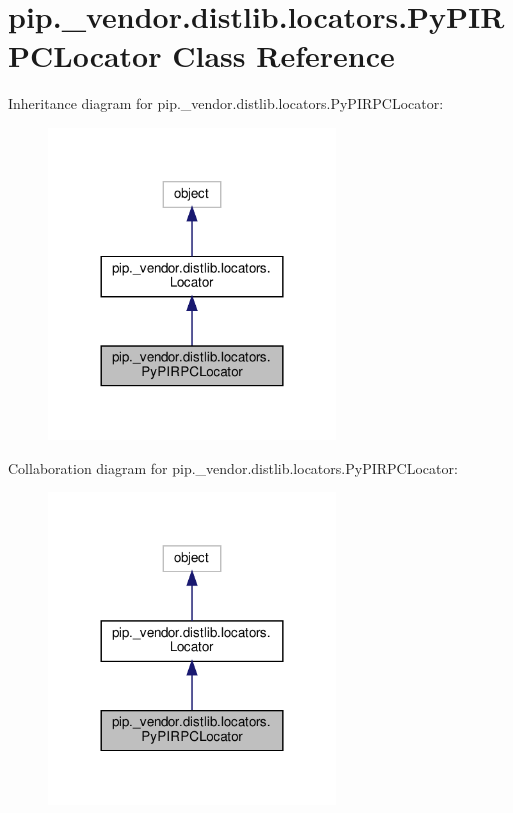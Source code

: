 \hypertarget{classpip_1_1__vendor_1_1distlib_1_1locators_1_1PyPIRPCLocator}{}\section{pip.\+\_\+vendor.\+distlib.\+locators.\+Py\+P\+I\+R\+P\+C\+Locator Class Reference}
\label{classpip_1_1__vendor_1_1distlib_1_1locators_1_1PyPIRPCLocator}


Inheritance diagram for pip.\+\_\+vendor.\+distlib.\+locators.\+Py\+P\+I\+R\+P\+C\+Locator\+:
\nopagebreak
\begin{figure}[H]
\begin{center}
\leavevmode
\includegraphics[width=216pt]{classpip_1_1__vendor_1_1distlib_1_1locators_1_1PyPIRPCLocator__inherit__graph}
\end{center}
\end{figure}


Collaboration diagram for pip.\+\_\+vendor.\+distlib.\+locators.\+Py\+P\+I\+R\+P\+C\+Locator\+:
\nopagebreak
\begin{figure}[H]
\begin{center}
\leavevmode
\includegraphics[width=216pt]{classpip_1_1__vendor_1_1distlib_1_1locators_1_1PyPIRPCLocator__coll__graph}
\end{center}
\end{figure}
